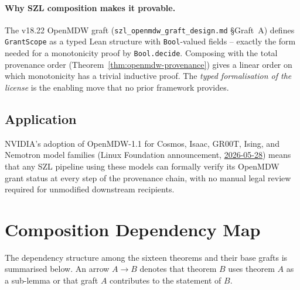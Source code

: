 \paragraph{Why SZL composition makes it provable.}
The v18.22 OpenMDW graft (\texttt{szl\_openmdw\_graft\_design.md}
\S{}Graft~A) defines \texttt{GrantScope} as a typed Lean structure
with \texttt{Bool}-valued fields -- exactly the form needed for
a monotonicity proof by \texttt{Bool.decide}.  Composing with
the total provenance order (Theorem~\ref{thm:openmdw-provenance})
gives a linear order on which monotonicity has a trivial
inductive proof.  The \emph{typed formalisation of the license}
is the enabling move that no prior framework provides.

\subsection*{Application}

NVIDIA's adoption of OpenMDW-1.1 for Cosmos, Isaac, GR00T, Ising,
and Nemotron model families (Linux Foundation announcement,
\href{https://www.linuxfoundation.org/press/linux-foundation-releases-openmdw-1.1-nvidia-adopts-openmdw-for-cosmos-isaac-gr00t-ising-and-nemotron-ai-model-families}{2026-05-28})
means that any SZL pipeline using these models can formally verify
its OpenMDW grant status at every step of the provenance chain,
with no manual legal review required for unmodified downstream
recipients.

\section{Composition Dependency Map}
\label{sec:composition-map}

The dependency structure among the sixteen theorems and their base
grafts is summarised below.  An arrow $A \to B$ denotes that theorem
$B$ uses theorem $A$ as a sub-lemma or that graft $A$ contributes
to the statement of $B$.

